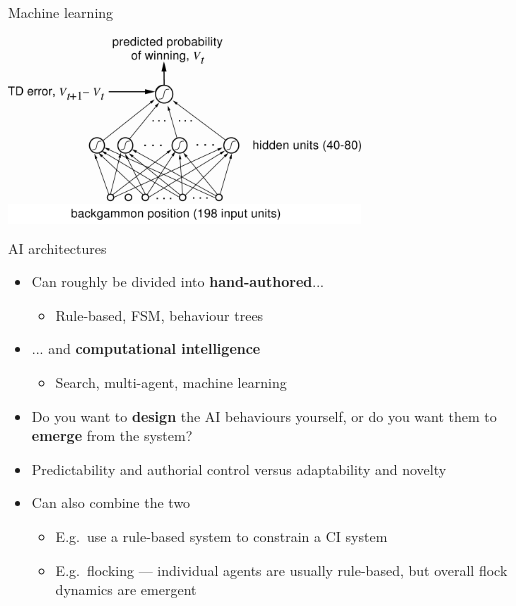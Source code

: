 \begin{frame}{Machine learning}
	\begin{center}
		\colorbox{white}{
			\includegraphics[width=0.7\textwidth]{tdgammon}
		}
	\end{center}
\end{frame}

\begin{frame}{AI architectures}
	\begin{itemize}
		\pause\item Can roughly be divided into \textbf{hand-authored}...
			\begin{itemize}
				\pause\item Rule-based, FSM, behaviour trees
			\end{itemize}
		\pause\item ... and \textbf{computational intelligence}
			\begin{itemize}
				\pause\item Search, multi-agent, machine learning
			\end{itemize}
		\pause\item Do you want to \textbf{design} the AI behaviours yourself,
			or do you want them to \textbf{emerge} from the system?
		\pause\item Predictability and authorial control versus adaptability and novelty
		\pause\item Can also combine the two
			\begin{itemize}
				\pause\item E.g.\ use a rule-based system to constrain a CI system
				\pause\item E.g.\ flocking --- individual agents are usually rule-based, but overall flock dynamics
					are emergent
			\end{itemize}
	\end{itemize}
\end{frame}
